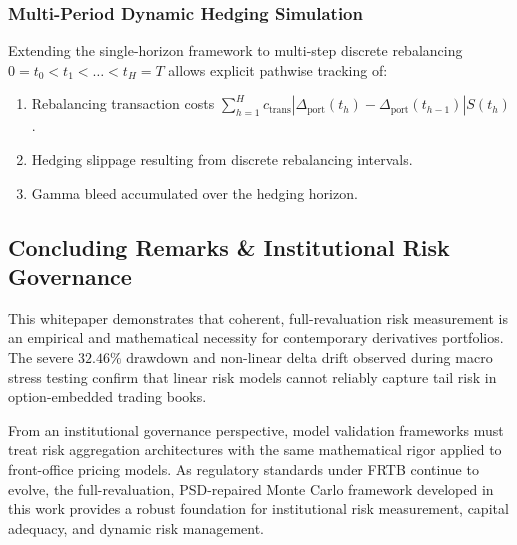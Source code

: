 \documentclass{article}
\theoremstyle{plain}
\theoremstyle{definition}
\theoremstyle{remark}
\begin{document}
\subsubsection{Multi-Period Dynamic Hedging Simulation}
Extending the single-horizon framework to multi-step discrete rebalancing $0 = t_0 < t_1 < \dots < t_H = T$ allows explicit pathwise tracking of:
\begin{enumerate}
    \item Rebalancing transaction costs $\sum_{h=1}^H c_{\text{trans}} |\Delta_{\text{port}}(t_h) - \Delta_{\text{port}}(t_{h-1})| S(t_h)$.
    \item Hedging slippage resulting from discrete rebalancing intervals.
    \item Gamma bleed accumulated over the hedging horizon.
\end{enumerate}

\subsection{Concluding Remarks \& Institutional Risk Governance}
\label{sec:ch5_conclusion}
This whitepaper demonstrates that coherent, full-revaluation risk measurement is an empirical and mathematical necessity for contemporary derivatives portfolios. The severe $32.46\%$ drawdown and non-linear delta drift observed during macro stress testing confirm that linear risk models cannot reliably capture tail risk in option-embedded trading books.

From an institutional governance perspective, model validation frameworks must treat risk aggregation architectures with the same mathematical rigor applied to front-office pricing models. As regulatory standards under FRTB continue to evolve, the full-revaluation, PSD-repaired Monte Carlo framework developed in this work provides a robust foundation for institutional risk measurement, capital adequacy, and dynamic risk management.
\end{document}
